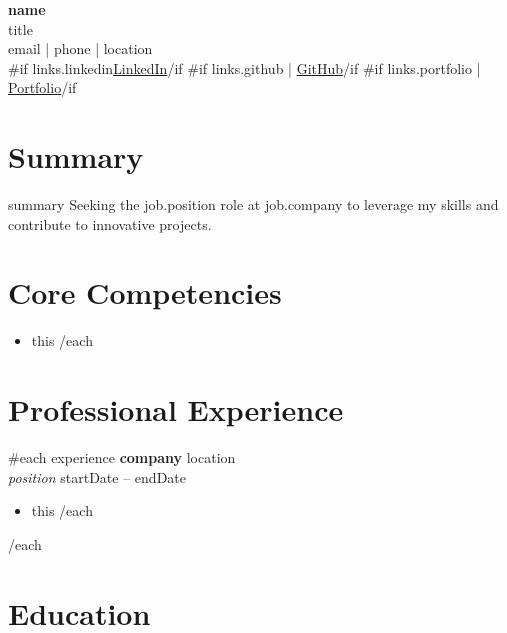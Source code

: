 \documentclass[11pt,a4paper]{article}
\begin{document}
\begin{center}
  {\huge \textbf{ {{name}} }}\\[0.3cm]
  {\large {{title}} }\\[0.2cm]
  {{email}} | {{phone}} | {{location}}\\
  {{#if links.linkedin}}\href{ {{links.linkedin}} }{LinkedIn}{{/if}}
  {{#if links.github}} | \href{ {{links.github}} }{GitHub}{{/if}}
  {{#if links.portfolio}} | \href{ {{links.portfolio}} }{Portfolio}{{/if}}
\end{center}

\vspace{0.3cm}

\section*{Summary}
{{summary}} Seeking the {{job.position}} role at {{job.company}} to leverage my skills and contribute to innovative projects.

\vspace{0.2cm}

\section*{Core Competencies}
\begin{itemize}[leftmargin=*,noitemsep,itemsep=0pt,label=$\bullet$,labelsep=0.5em]
{{#each skills}}
  \item {{this}}
{{/each}}
\end{itemize}

\vspace{0.2cm}

\section*{Professional Experience}

{{#each experience}}
\noindent
\textbf{ {{company}} } \hfill {{location}}\\
\textit{ {{position}} } \hfill {{startDate}} -- {{endDate}}
\begin{itemize}[leftmargin=*,noitemsep,itemsep=2pt]
{{#each description}}
  \item {{this}}
{{/each}}
\end{itemize}
\vspace{0.15cm}
{{/each}}

\section*{Education}
\end{document}
